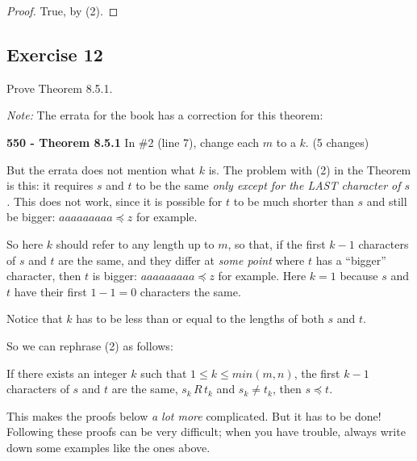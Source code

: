 \documentclass[14pt]{extarticle}
\begin{document}
\begin{proof}
True, by (2).
\end{proof}

\subsection{Exercise 12}
Prove Theorem 8.5.1.

{\it Note:} The errata for the book has a correction for this theorem:

{\bf 550 - Theorem 8.5.1} In \#2 (line 7), change each $m$ to a $k$. (5 changes)

But the errata does not mention what $k$ is. The problem with (2) in the Theorem is this: it requires $s$ and $t$ to
be the same {\it only except for the LAST character of $s$.} This does not work, since it is possible for $t$ to 
be much shorter than $s$ and still be bigger: \(aaaaaaaaa \preceq z\) for example.

So here $k$ should refer to any length up to $m$, so that, if the first $k-1$ characters of $s$ and $t$ are the same, 
and they differ at {\it some point} where $t$ has a ``bigger'' character, then $t$ is bigger: \(aaaaaaaaa 
\preceq z\) for example. Here $k = 1$ because $s$ and $t$ have their first $1-1 = 0$ characters the same. 

Notice that $k$ has to be less than or equal to the lengths of both $s$ and $t$.

So we can rephrase (2) as follows:

If there exists an integer $k$ such that \(1 \leq k \leq min(m,n)\), the first $k-1$ characters of $s$ and $t$ are 
the same, \(s_k \,R\, t_k\) and \(s_k \neq t_k\), then \(s \preceq t\).

This makes the proofs below {\it a lot more} complicated. But it has to be done! Following these proofs can be very
difficult; when you have trouble, always write down some examples like the ones above.
\end{document}
